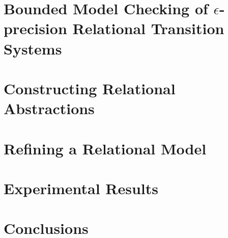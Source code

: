 \documentclass[9pt,sigconf]{acmart}
\begin{document}
\section{Bounded Model Checking of $\epsilon$-precision Relational Transition Systems}
\label{sec:bmc}


\section{Constructing Relational Abstractions}


\section{Refining a Relational Model}
\label{sec:rel-mod}







\section{Experimental Results}
\label{sec:res}



\section{Conclusions}
\label{sec:concl}





% 
\end{document}

